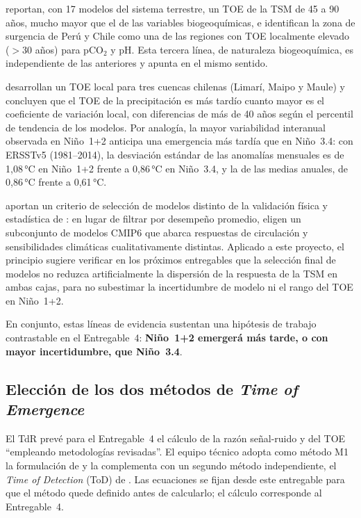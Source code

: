 \citet{keller2014} reportan, con 17 modelos del sistema terrestre, un TOE de la TSM de 45 a 90 años, mucho mayor que el de las variables biogeoquímicas, e identifican la zona de surgencia de Perú y Chile como una de las regiones con TOE localmente elevado ($>$30 años) para pCO$_2$ y pH. Esta tercera línea, de naturaleza biogeoquímica, es independiente de las anteriores y apunta en el mismo sentido.

\citet{chadwick2019} desarrollan un TOE local para tres cuencas chilenas (Limarí, Maipo y Maule) y concluyen que el TOE de la precipitación es más tardío cuanto mayor es el coeficiente de variación local, con diferencias de más de 40 años según el percentil de tendencia de los modelos. Por analogía, la mayor variabilidad interanual observada en Niño~1+2 anticipa una emergencia más tardía que en Niño~3.4: con ERSSTv5 (1981--2014), la desviación estándar de las anomalías mensuales es de 1{,}08\,°C en Niño~1+2 frente a 0{,}86\,°C en Niño~3.4, y la de las medias anuales, de 0{,}86\,°C frente a 0{,}61\,°C.

\citet{lois2026} aportan un criterio de selección de modelos distinto de la validación física y estadística de \citet{bruno2023}: en lugar de filtrar por desempeño promedio, eligen un subconjunto de modelos CMIP6 que abarca respuestas de circulación y sensibilidades climáticas cualitativamente distintas. Aplicado a este proyecto, el principio sugiere verificar en los próximos entregables que la selección final de modelos no reduzca artificialmente la dispersión de la respuesta de la TSM en ambas cajas, para no subestimar la incertidumbre de modelo ni el rango del TOE en Niño~1+2.

En conjunto, estas líneas de evidencia sustentan una hipótesis de trabajo contrastable en el Entregable~4: \textbf{Niño~1+2 emergerá más tarde, o con mayor incertidumbre, que Niño~3.4}.

\subsection{Elección de los dos métodos de \emph{Time of Emergence}}
\label{sec:toe_metodos}

El TdR prevé para el Entregable~4 el cálculo de la razón señal-ruido y del TOE ``empleando metodologías revisadas''. El equipo técnico adopta como método M1 la formulación de \citet{szabo2016} y la complementa con un segundo método independiente, el \emph{Time of Detection} (ToD) de \citet{gopika2024}. Las ecuaciones se fijan desde este entregable para que el método quede definido antes de calcularlo; el cálculo corresponde al Entregable~4.

